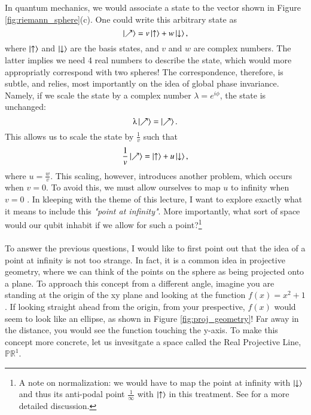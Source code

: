 In quantum mechanics, we would associate a state to the vector shown in Figure \ref{fig:riemann_sphere}(c). One could write this arbitrary state as
\begin{equation} \label{eq:qubit_state}
    \ket{\nearrow} = v \ket{\uparrow} + w \ket{\downarrow},
\end{equation}
where $\ket{\uparrow}$ and $\ket{\downarrow}$ are the basis states, and $v$ and $w$ are complex numbers. The latter implies we need 4 real numbers to describe the state, which would more appropriatly correspond with two spheres! The correspondence, therefore, is subtle, and relies, most importantly on the idea of global phase invariance. Namely, if we scale the state by a complex number $\lambda = e^{i \phi}$, the state is unchanged:
\begin{equation} \label{eq:global_phase}
    \lambda \ket{\nearrow} =  \ket{\nearrow} .
\end{equation}
This allows us to scale the state by $\frac{1}{v}$ such that 
\begin{equation} \label{eq:qubit_state_normalized}
    \frac{1}{v} \ket{\nearrow} = \ket{\uparrow} + u \ket{\downarrow},
\end{equation}
where $u = \frac{w}{v}$. This scaling, however, introduces another problem, which occurs when $v=0$. To avoid this, we must allow ourselves to map $u$ to infinity when $v=0$ \cite{penrose_fashion_2016}. In kleeping with the theme of this lecture, I want to explore exactly what it means to include this \textit{"point at infinity"}. More importantly, what sort of space would our qubit inhabit if we allow for such a point?\footnote{A note on normalization: we would have to map the point at infinity with $\ket{\downarrow}$ and thus its anti-podal point $\frac{1}{\infty}$ with $\ket{\uparrow}$ in this treatment. See \cite{penrose_fashion_2016} for a more detailed discussion.} 
\\ \\
To answer the previous questions, I would like to first point out that the idea of a point at infinity is not too strange. In fact, it is a common idea in projective geometry, where we can think of the points on the sphere as being projected onto a plane. To approach this concept from a different angle, imagine you are standing at the origin of the xy plane and looking at the function $f(x) = x^2 + 1$. If looking straight ahead from the origin, from your prespective, $f(x)$ would seem to look like an ellipse, as shown in Figure \ref{fig:proj_geometry}! Far away in the distance, you would see the function touching the y-axis. To make this concept more concrete, let us invesitgate a space called the Real Projective Line, $\mathbb{PR}^1$. 

